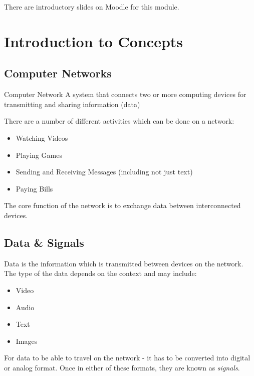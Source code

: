 
\begin{extlink}
There are introductory slides on Moodle for this module.
\end{extlink}

\section{Introduction to Concepts}

\subsection{Computer Networks}
\begin{define}
    \item[Computer Network] A system that connects two or more computing devices for transmitting and sharing information (data)
\end{define}

There are a number of different activities which can be done on a network:
\begin{itemize}
    \item Watching Videos
    \item Playing Games
    \item Sending and Receiving Messages (including not just text)
    \item Paying Bills
\end{itemize}

The core function of the network is to exchange data between interconnected devices.

\subsection{Data \& Signals}
Data is the information which is transmitted between devices on the network. The type of the data depends on the context and may include:
\begin{itemize}
    \item Video
    \item Audio
    \item Text
    \item Images
\end{itemize}

For data to be able to travel on the network - it has to be converted into digital or analog format. Once in either of these formats, they are known as \textit{signals}.

